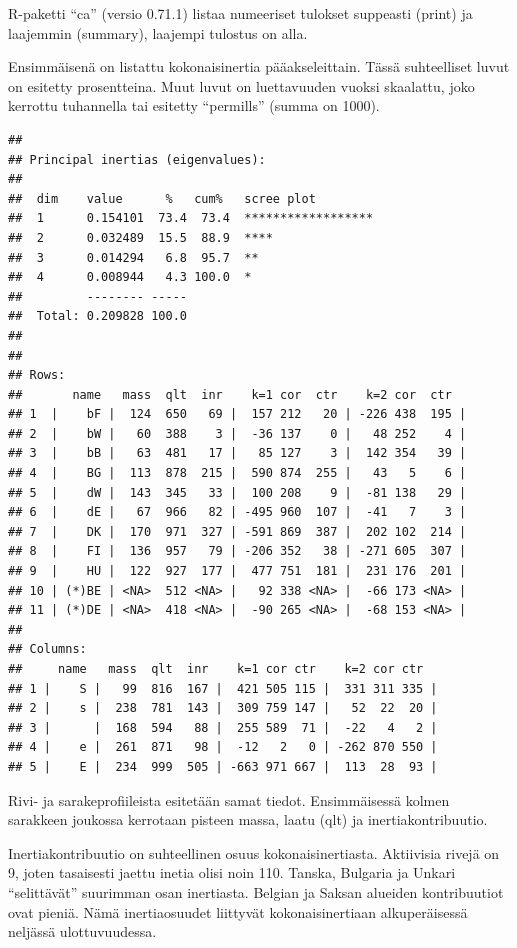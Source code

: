 \documentclass[
  finnish,
]{book}
\begin{document}
R-paketti ``ca'' (versio 0.71.1) listaa numeeriset tulokset suppeasti (print) ja laajemmin
(summary), laajempi tulostus on alla.

Ensimmäisenä on listattu kokonaisinertia pääakseleittain. Tässä suhteelliset luvut
on esitetty prosentteina. Muut luvut on luettavuuden vuoksi skaalattu, joko kerrottu
tuhannella tai esitetty ``permills'' (summa on 1000).

\begin{verbatim}
## 
## Principal inertias (eigenvalues):
## 
##  dim    value      %   cum%   scree plot               
##  1      0.154101  73.4  73.4  ******************       
##  2      0.032489  15.5  88.9  ****                     
##  3      0.014294   6.8  95.7  **                       
##  4      0.008944   4.3 100.0  *                        
##         -------- -----                                 
##  Total: 0.209828 100.0                                 
## 
## 
## Rows:
##       name   mass  qlt  inr    k=1 cor  ctr    k=2 cor  ctr  
## 1  |    bF |  124  650   69 |  157 212   20 | -226 438  195 |
## 2  |    bW |   60  388    3 |  -36 137    0 |   48 252    4 |
## 3  |    bB |   63  481   17 |   85 127    3 |  142 354   39 |
## 4  |    BG |  113  878  215 |  590 874  255 |   43   5    6 |
## 5  |    dW |  143  345   33 |  100 208    9 |  -81 138   29 |
## 6  |    dE |   67  966   82 | -495 960  107 |  -41   7    3 |
## 7  |    DK |  170  971  327 | -591 869  387 |  202 102  214 |
## 8  |    FI |  136  957   79 | -206 352   38 | -271 605  307 |
## 9  |    HU |  122  927  177 |  477 751  181 |  231 176  201 |
## 10 | (*)BE | <NA>  512 <NA> |   92 338 <NA> |  -66 173 <NA> |
## 11 | (*)DE | <NA>  418 <NA> |  -90 265 <NA> |  -68 153 <NA> |
## 
## Columns:
##     name   mass  qlt  inr    k=1 cor ctr    k=2 cor ctr  
## 1 |    S |   99  816  167 |  421 505 115 |  331 311 335 |
## 2 |    s |  238  781  143 |  309 759 147 |   52  22  20 |
## 3 |      |  168  594   88 |  255 589  71 |  -22   4   2 |
## 4 |    e |  261  871   98 |  -12   2   0 | -262 870 550 |
## 5 |    E |  234  999  505 | -663 971 667 |  113  28  93 |
\end{verbatim}

Rivi- ja sarakeprofiileista esitetään samat tiedot. Ensimmäisessä kolmen
sarakkeen joukossa kerrotaan pisteen massa, laatu (qlt) ja inertiakontribuutio.

Inertiakontribuutio on suhteellinen osuus kokonaisinertiasta. Aktiivisia rivejä on 9,
joten tasaisesti jaettu inetia olisi noin 110. Tanska, Bulgaria ja Unkari ``selittävät''
suurimman osan inertiasta. Belgian ja Saksan alueiden kontribuutiot ovat pieniä.
Nämä inertiaosuudet liittyvät kokonaisinertiaan alkuperäisessä neljässä ulottuvuudessa.
\end{document}
